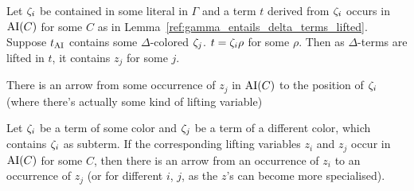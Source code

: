 \documentclass[,%
	paper=a4,%
	DIV12, %
	twoside=false,%
	liststotoc,
	bibtotoc,
	draft=false,%
	numbers=noendperiod
]{scrartcl}
\begin{document}
\begin{conj}
	Let $\zeta_{i}$ be contained in some literal in $\Gamma$ and
	a term $t$ derived from $\zeta_{i}$ occurs in $\operatorname{AI}(C)$ for some $C$ as in Lemma~\ref{ref:gamma_entails_delta_terms_lifted}. 
	Suppose $t_{\operatorname{AI}}$ contains some $\Delta$-colored $\zeta_{j}$.
	$t = \zeta_{i}\rho$ for some $\rho$.
	Then as $\Delta$-terms are lifted in $t$, it contains $z_j$ for some $j$.

	There is an arrow from some occurrence of $z_j$ in $\operatorname{AI}(C)$ to the position of $\zeta_{i}$ (where there's actually some kind of lifting variable)


\end{conj}

\begin{conj}
	Let $\zeta_{i}$ be a term of some color and $\zeta_{j}$ be a term of a different color, which contains $\zeta_{i}$ as subterm.
	If the corresponding lifting variables $z_i$ and $z_j$ occur in $\operatorname{AI}(C)$ for some $C$, then there is an arrow from an occurrence of $z_i$ to an occurrence of $z_j$ (or for different $i$, $j$, as the $z$'s can become more specialised).

\end{conj}
\end{document}
